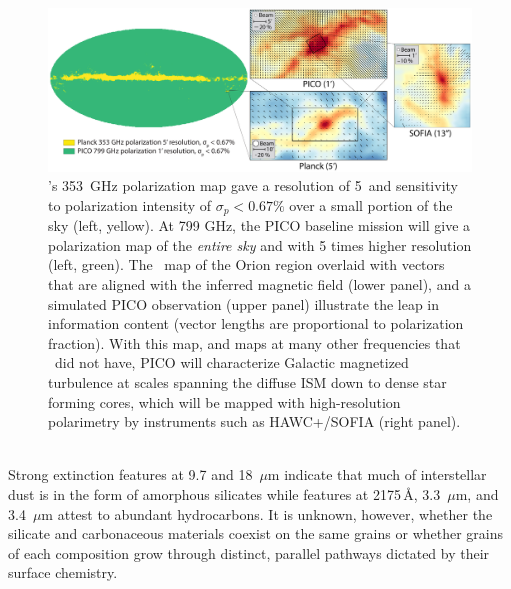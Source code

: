 \documentclass[PICOReport.tex]{subfiles}
\begin{document}
%
%
\begin{figure}
    \centering
    \includegraphics[width=6.5in]{galsci_fig_v4.pdf}
    \caption{\captiontext  \planck 's 353~GHz polarization map gave a resolution of 5\arcmin~and sensitivity to polarization intensity of $\sigma_{p} < 0.67\%$ over a small portion of the sky (left, yellow).  At 799 GHz, the PICO baseline mission will give a polarization map of the {\it entire sky} and with 5 times higher resolution (left, green). The \planck~map of the Orion region overlaid with vectors that are aligned with the inferred magnetic field (lower panel), and a simulated PICO observation (upper panel) illustrate the leap in information content (vector lengths are proportional to polarization fraction). With this map, and maps at many other frequencies that \planck~did not have, PICO will characterize Galactic magnetized turbulence at scales spanning the diffuse ISM down to dense star forming cores, which will be mapped with high-resolution polarimetry by instruments such as HAWC+/SOFIA \citep{Chuss2018} (right panel).}
    \label{fig:allsky}
\end{figure}

 \\
Strong extinction features at 9.7 and 18~$\mu$m indicate that much of interstellar dust is in the form of amorphous silicates while features at 2175\,\AA, 3.3~$\mu$m, and 3.4~$\mu$m attest to abundant hydrocarbons. It is unknown, however, whether the silicate and carbonaceous materials coexist on the same grains or whether grains of each composition grow through distinct, parallel pathways dictated by their surface chemistry. 
\end{document}
